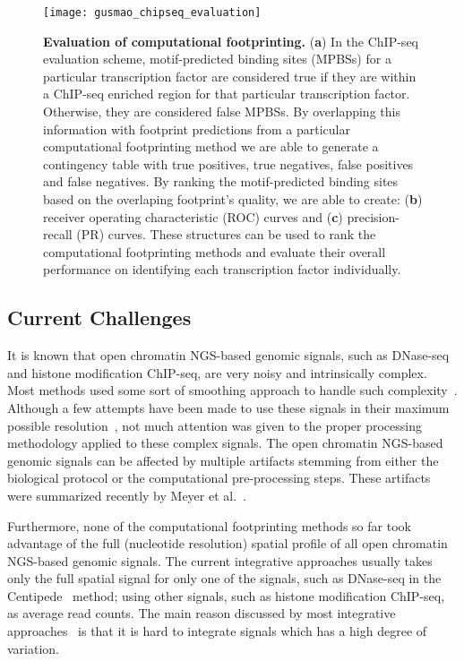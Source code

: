 \begin{figure}[h!]
\centering
\texttt{[image: gusmao\_chipseq\_evaluation]}
\caption[Evaluation of computational footprinting]{\textbf{Evaluation of computational footprinting.} (\textbf{a}) In the ChIP-seq evaluation scheme, motif-predicted binding sites (MPBSs) for a particular transcription factor are considered true if they are within a ChIP-seq enriched region for that particular transcription factor. Otherwise, they are considered false MPBSs. By overlapping this information with footprint predictions from a particular computational footprinting method we are able to generate a contingency table with true positives, true negatives, false positives and false negatives. By ranking the motif-predicted binding sites based on the overlaping footprint's quality, we are able to create: (\textbf{b}) receiver operating characteristic (ROC) curves and (\textbf{c}) precision-recall (PR) curves. These structures can be used to rank the computational footprinting methods and evaluate their overall performance on identifying each transcription factor individually.}
\label{fig:gusmao_chipseq_evaluation}
\end{figure}

\subsection{Current Challenges}
\label{sec:current.challenges}

It is known that open chromatin NGS-based genomic signals, such as DNase-seq and histone modification ChIP-seq, are very noisy and intrinsically complex. Most methods used some sort of smoothing approach to handle such complexity~\cite{pique2011,cuellar2012,sherwood2014,kahara2015}. Although a few attempts have been made to use these signals in their maximum possible resolution~\cite{boyle2011,sung2014}, not much attention was given to the proper processing methodology applied to these complex signals. The open chromatin NGS-based genomic signals can be affected by multiple artifacts stemming from either the biological protocol or the computational pre-processing steps. These artifacts were summarized recently by Meyer et al.~\cite{meyer2014}.

Furthermore, none of the computational footprinting methods so far took advantage of the full (nucleotide resolution) spatial profile of all open chromatin NGS-based genomic signals. The current integrative approaches usually takes only the full spatial signal for only one of the signals, such as DNase-seq in the Centipede~\cite{pique2011} method; using other signals, such as histone modification ChIP-seq, as average read counts. The main reason discussed by most integrative approaches~\cite{pique2011,cuellar2012} is that it is hard to integrate signals which has a high degree of variation.

